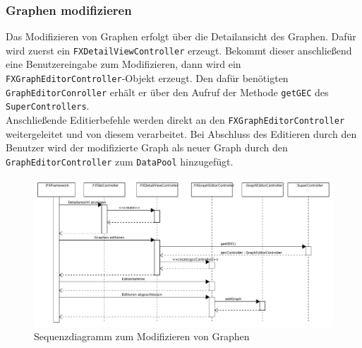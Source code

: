 	\subsubsection{Graphen modifizieren}
	Das Modifizieren von Graphen erfolgt über die Detailansicht des Graphen. Dafür wird zuerst ein \newline \texttt{FXDetailViewController} erzeugt. Bekommt dieser anschließend eine Benutzereingabe zum Modifizieren, dann wird ein \texttt{FXGraphEditorController}-Objekt erzeugt. Den dafür benötigten \texttt{GraphEditorConroller} erhält er über den Aufruf der Methode \texttt{getGEC} des \texttt{SuperControllers}.\\
	Anschließende Editierbefehle werden direkt an den \texttt{FXGraphEditorController} weitergeleitet und von diesem verarbeitet. Bei Abschluss des Editieren durch den Benutzer wird der modifizierte Graph als neuer Graph durch den \texttt{GraphEditorController} zum \texttt{DataPool} hinzugefügt.
\begin{figure}
	\centering
\includegraphics[width=\textwidth]{abbildungen/graphmod-seq.pdf}
\caption{Sequenzdiagramm zum Modifizieren von Graphen }
	\label{img:grapmod-seq}
	\end{figure}
	